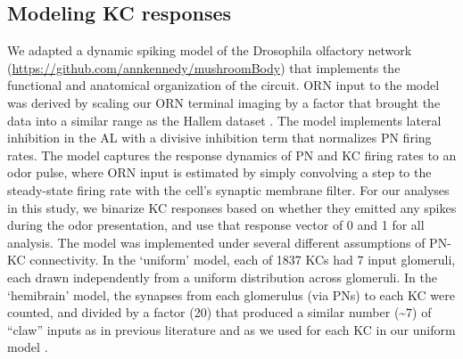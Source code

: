 \documentclass[12pt]{caltech_thesis}
\renewcommand{\cite}{{ }\autocite}
\let\Oldsubsection\subsection
\renewcommand{\subsection}{\FloatBarrier\Oldsubsection}
\begin{document}
\begin{refsection}
\subsection{Modeling KC responses}
\label{ssec:remypaper_modeling}
We adapted a dynamic spiking model of the Drosophila olfactory network\cite{Kennedy2019} (\url{https://github.com/annkennedy/mushroomBody}) that implements the functional and anatomical organization of the circuit.
ORN input to the model was derived by scaling our ORN terminal imaging by a factor that brought the data into a similar range as the Hallem dataset\cite{Hallem2006}.
The model implements lateral inhibition in the AL with a divisive inhibition term that normalizes PN firing rates.
The model captures the response dynamics of PN and KC firing rates to an odor pulse, where ORN input is estimated by simply convolving a step to the steady-state firing rate with the cell's synaptic membrane filter.
For our analyses in this study, we binarize KC responses based on whether they emitted any spikes during the odor presentation, and use that response vector of 0 and 1 for all analysis.
The model was implemented under several different assumptions of PN-KC connectivity.
In the `uniform' model, each of \num{1837} KCs had 7 input glomeruli, each drawn independently from a uniform distribution across glomeruli.
In the `hemibrain' model, the synapses from each glomerulus (via PNs) to each KC were counted, and divided by a factor (20) that produced a similar number (\textasciitilde 7) of ``claw'' inputs as in previous literature and as we used for each KC in our uniform model\cite{Hemibrain}.

\end{refsection}
\end{document}
